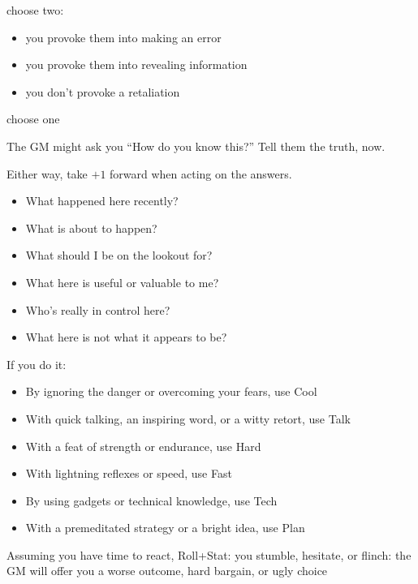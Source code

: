
{choose two:
\begin{itemize}
\item you provoke them into making an error
\item you provoke them into revealing information
\item you don't provoke a retaliation
\end{itemize}}
{choose one}


The GM might ask you ``How do you know this?'' Tell them the truth, now.


Either way, take $+1$ forward when acting on the answers.

\begin{itemize}
\item What happened here recently?
\item What is about to happen?
\item What should I be on the lookout for?
\item What here is useful or valuable to me?
\item Who's really in control here?
\item What here is not what it appears to be?
\end{itemize}

If you do it:
\begin{itemize}
\item By ignoring the danger or overcoming your fears, use Cool
\item With quick talking, an inspiring word, or a witty retort, use Talk
\item With a feat of strength or endurance, use Hard
\item With lightning reflexes or speed, use Fast
\item By using gadgets or technical knowledge, use Tech
\item With a premeditated strategy or a bright idea, use Plan
\end{itemize}
Assuming you have time to react, Roll+Stat:
{you stumble, hesitate, or flinch: the GM will offer you a worse outcome, hard bargain, or ugly choice}

